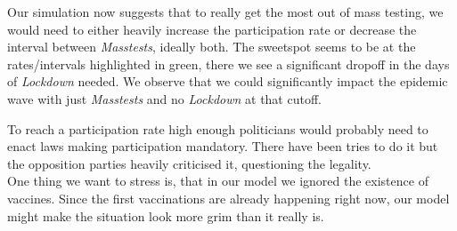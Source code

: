 \documentclass
[
    report,
    11pt,
    bibliography = totoc,
    listof = totoc,
    headinclude = true,
]
{scrreport}
\begin{document}
Our simulation now suggests that to really get the most out of mass testing, we would need to either heavily increase the participation rate or decrease the interval between \textit{Masstests}, ideally both. The sweetspot seems to be at the rates/intervals highlighted in green, there we see a significant dropoff in the days of \textit{Lockdown} needed. We observe that we could significantly impact the epidemic wave with just \textit{Masstests} and no \textit{Lockdown} at that cutoff.

To reach a participation rate high enough politicians would probably need to enact laws making participation mandatory. There have been tries to do it but the opposition parties heavily criticised it, questioning the legality. \\

One thing we want to stress is, that in our model we ignored the existence of vaccines. Since the first vaccinations are already happening right now, our model might make the situation look more grim than it really is.

\begingroup
\renewcommand{\cleardoublepage}{}
\renewcommand{\clearpage}{}
\printbibliography
\endgroup
\end{document}
